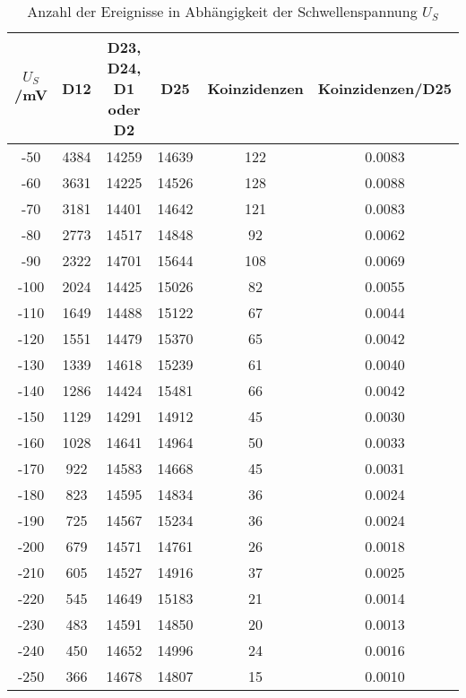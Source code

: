 \begin{table}[h]
\centering
\small
\caption{Anzahl der Ereignisse in Abhängigkeit der Schwellenspannung $U_S$}
\label{tab:schwelle}
\begin{tabular}{cccccc}
\toprule
$U_S$/\si{\milli\volt}& D12 & D23, D24, D1 oder D2 & D25 & Koinzidenzen & Koinzidenzen/D25\\
\midrule
-50 & 4384 & 14259 & 14639 & 122 & 0.0083\\
-60 & 3631 & 14225 & 14526 & 128 & 0.0088\\
-70 & 3181 & 14401 & 14642 & 121 & 0.0083\\
-80 & 2773 & 14517 & 14848 & 92 & 0.0062\\
-90 & 2322 & 14701 & 15644 & 108 & 0.0069\\
-100 & 2024 & 14425 & 15026 & 82 & 0.0055\\
-110 & 1649 & 14488 & 15122 & 67 & 0.0044\\
-120 & 1551 & 14479 & 15370 & 65 & 0.0042\\
-130 & 1339 & 14618 & 15239 & 61 & 0.0040\\
-140 & 1286 & 14424 & 15481 & 66 & 0.0042\\
-150 & 1129 & 14291 & 14912 & 45 & 0.0030\\
-160 & 1028 & 14641 & 14964 & 50 & 0.0033\\
-170 & 922 & 14583 & 14668 & 45 & 0.0031\\
-180 & 823 & 14595 & 14834 & 36 & 0.0024\\
-190 & 725 & 14567 & 15234 & 36 & 0.0024\\
-200 & 679 & 14571 & 14761 & 26 & 0.0018\\
-210 & 605 & 14527 & 14916 & 37 & 0.0025\\
-220 & 545 & 14649 & 15183 & 21 & 0.0014\\
-230 & 483 & 14591 & 14850 & 20 & 0.0013\\
-240 & 450 & 14652 & 14996 & 24 & 0.0016\\
-250 & 366 & 14678 & 14807 & 15 & 0.0010\\
\bottomrule
\end{tabular}
\end{table}

